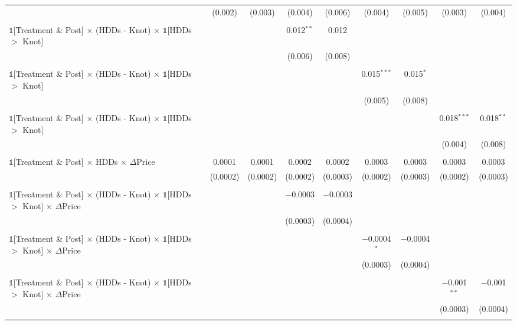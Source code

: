\begin{table}[!htbp]
\begin{longtable}{@{\extracolsep{0pt}}lcccccccc}
  & (0.002) & (0.003) & (0.004) & (0.006) & (0.004) & (0.005) & (0.003) & (0.004) \\ 
  & & & & & & & & \\ 
 $\mathbb{1}$[Treatment \& Post] $\times$ (HDDs - Knot) $\times$ $\mathbb{1}$[HDDs $>$ Knot] &  &  & 0.012$^{**}$ & 0.012 &  &  &  &  \\ 
  &  &  & (0.006) & (0.008) &  &  &  &  \\ 
  & & & & & & & & \\ 
 $\mathbb{1}$[Treatment \& Post] $\times$ (HDDs - Knot) $\times$ $\mathbb{1}$[HDDs $>$ Knot] &  &  &  &  & 0.015$^{***}$ & 0.015$^{*}$ &  &  \\ 
  &  &  &  &  & (0.005) & (0.008) &  &  \\ 
  & & & & & & & & \\ 
 $\mathbb{1}$[Treatment \& Post] $\times$ (HDDs - Knot) $\times$ $\mathbb{1}$[HDDs $>$ Knot] &  &  &  &  &  &  & 0.018$^{***}$ & 0.018$^{**}$ \\ 
  &  &  &  &  &  &  & (0.004) & (0.008) \\ 
  & & & & & & & & \\ 
 $\mathbb{1}$[Treatment \& Post] $\times$ HDDs $\times$ $\Delta$Price & 0.0001 & 0.0001 & 0.0002 & 0.0002 & 0.0003 & 0.0003 & 0.0003 & 0.0003 \\ 
  & (0.0002) & (0.0002) & (0.0002) & (0.0003) & (0.0002) & (0.0003) & (0.0002) & (0.0003) \\ 
  & & & & & & & & \\ 
 $\mathbb{1}$[Treatment \& Post] $\times$ (HDDs - Knot) $\times$ $\mathbb{1}$[HDDs $>$ Knot] $\times$ $\Delta$Price &  &  & $-$0.0003 & $-$0.0003 &  &  &  &  \\ 
  &  &  & (0.0003) & (0.0004) &  &  &  &  \\ 
  & & & & & & & & \\ 
 $\mathbb{1}$[Treatment \& Post] $\times$ (HDDs - Knot) $\times$ $\mathbb{1}$[HDDs $>$ Knot] $\times$ $\Delta$Price &  &  &  &  & $-$0.0004$^{*}$ & $-$0.0004 &  &  \\ 
  &  &  &  &  & (0.0003) & (0.0004) &  &  \\ 
  & & & & & & & & \\ 
 $\mathbb{1}$[Treatment \& Post] $\times$ (HDDs - Knot) $\times$ $\mathbb{1}$[HDDs $>$ Knot] $\times$ $\Delta$Price &  &  &  &  &  &  & $-$0.001$^{**}$ & $-$0.001 \\ 
  &  &  &  &  &  &  & (0.0003) & (0.0004) \\ 
  & & & & & & & & \\ 

\end{longtable}
\end{table}
